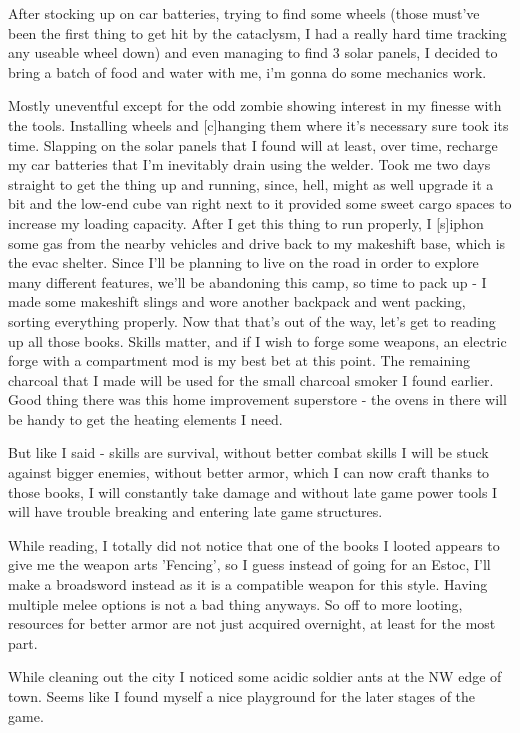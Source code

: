 \documentclass[11pt]{report}
\begin{document}
After stocking up on car batteries, trying to find some wheels (those must've been the first thing to get hit by the cataclysm, I had a really hard time tracking any useable wheel down) and even managing to find 3 solar panels, I decided to bring a batch of food and water with me, i'm gonna do some mechanics work.

Mostly uneventful except for the odd zombie showing interest in my finesse with the tools. Installing wheels and [c]hanging them where it's necessary sure took its time. Slapping on the solar panels that I found will at least, over time, recharge my car batteries that I'm inevitably drain using the welder. Took me two days straight to get the thing up and running, since, hell, might as well upgrade it a bit and the low-end cube van right next to it provided some sweet cargo spaces to increase my loading capacity. After I get this thing to run properly, I [s]iphon some gas from the nearby vehicles and drive back to my makeshift base, which is the evac shelter. Since I'll be planning to live on the road in order to explore many different features, we'll be abandoning this camp, so time to pack up - I made some makeshift slings and wore another backpack and went packing, sorting everything properly. Now that that's out of the way, let's get to reading up all those books. Skills matter, and if I wish to forge some weapons, an electric forge with a compartment mod is my best bet at this point. The remaining charcoal that I made will be used for the small charcoal smoker I found earlier. Good thing there was this home improvement superstore - the ovens in there will be handy to get the heating elements I need.

But like I said - skills are survival, without better combat skills I will be stuck against bigger enemies, without better armor, which I can now craft thanks to those books, I will constantly take damage and without late game power tools I will have trouble breaking and entering late game structures.

While reading, I totally did not notice that one of the books I looted appears to give me the weapon arts 'Fencing', so I guess instead of going for an Estoc, I'll make a broadsword instead as it is a compatible weapon for this style. Having multiple melee options is not a bad thing anyways. So off to more looting, resources for better armor are not just acquired overnight, at least for the most part.

While cleaning out the city I noticed some acidic soldier ants at the NW edge of town. Seems like I found myself a nice playground for the later stages of the game.
\end{document}
